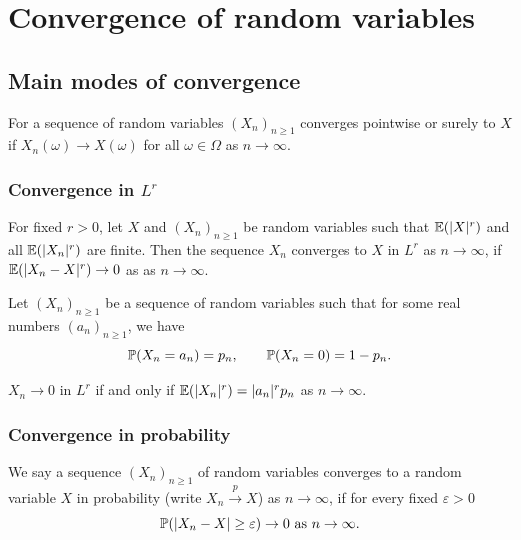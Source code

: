 \documentclass[10pt, a4paper]{article}
\begin{document}
\newpage

\section{Convergence of random variables}

\subsection{Main modes of convergence}

\begin{definition}
    For a sequence of random variables $(X_n)_{n \geq 1}$ converges pointwise or surely to $X$ if $X_n(\omega) \to X(\omega)$ for all $\omega \in \Omega$ as $n \to \infty$.
\end{definition}

\subsubsection{Convergence in \texorpdfstring{$L ^ r$}{}}
\begin{definition}
    For fixed $r > 0$,
    let $X$ and $(X_n)_{n \geq 1}$ be random variables such that $\E(|X| ^ r)$ and all $\E(|X_n| ^ r)$ are finite.
    Then the sequence $X_n$ converges to $X$ in $L ^ r$ as $n \to \infty$,
    if $\E(|X_n - X| ^ r) \to 0$ as  as $n \to \infty$.
\end{definition}

\begin{example}
    Let $(X_n)_{n \geq 1}$ be a sequence of random variables such that for some real numbers $(a_n)_{n \geq 1}$,
    we have
    \[
    \P(X_n = a_n) = p_n,\qquad \P(X_n = 0) = 1 - p_n.
    \]

    $X_n \to 0$ in $L ^ r$ if and only if $\E(|X_n| ^ r) = |a_n| ^ rp_n$ as $n \to \infty$.
\end{example}

\subsubsection{Convergence in probability}
\begin{definition}
    We say a sequence $(X_n)_{n \geq 1}$ of random variables converges to a random variable $X$ in probability
    (write $X_n \overset{p}{\to} X$)
    as $n \to \infty$,
    if for every fixed $\varepsilon > 0$
    \[
    \P(|X_n - X| \geq \varepsilon) \to 0\text{ as } n \to \infty.
    \]
\end{definition}
\end{document}
